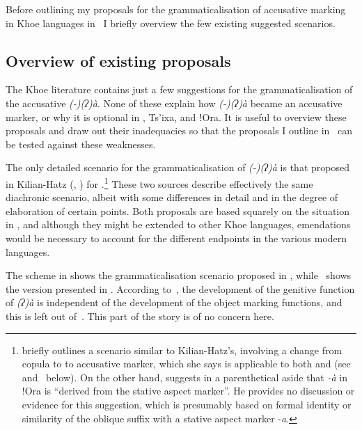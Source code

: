 \documentclass[output=paper]{LSP/langsci}
\begin{document}
Before outlining my proposals for the grammaticalisation of accusative marking in Khoe languages in~ I briefly overview the few existing suggested scenarios.

\subsection{Overview of existing proposals} \label{09-mc-sec:4-1}
The Khoe literature contains just a few suggestions for the grammaticalisation of the accusative \textit{(-)(ʔ)à}. None of these explain how \textit{(-)(ʔ)à} became an accusative marker, or why it is optional in , Ts’ixa,  and ǃOra. It is useful to overview these proposals and draw out their inadequacies so that the proposals I outline in~ can be tested against these weaknesses.

The only detailed scenario for the grammaticalisation of \textit{(-)(ʔ)à} is that proposed in Kilian-Hatz (\citeyear[55]{Kilian-Hatz2008Grammar}, \citeyear[376--378]{Kilian-Hatz2013Kxoe}) for .\footnote{\citet[276--278]{Koenig2008Case} briefly outlines a scenario similar to Kilian-Hatz’s, involving a change from copula to  to accusative marker, which she says is applicable to both  and  (see~ and~ below).  On the other hand, \citet[342]{Haacke2013Gora} suggests in a parenthetical aside that \textit{-à} in !Ora is “derived from the stative aspect marker”. He provides no discussion or evidence for this suggestion, which is presumably based on formal identity or similarity of the oblique suffix with a stative aspect marker -\textit{a}.}  
These two sources describe effectively the same diachronic scenario, albeit with some differences in detail and in the degree of elaboration of certain points. Both proposals are based squarely on the situation in , and although they might be extended to other Khoe languages, emendations would be necessary to account for the different endpoints in the various modern languages.

The scheme in  shows the grammaticalisation scenario proposed in \citet[55]{Kilian-Hatz2008Grammar}, while~ shows the version presented in \citet[376--377]{Kilian-Hatz2013Kxoe}. According to~, the development of the genitive function of \textit{(ʔ)à} is independent of the development of the object marking functions, and this is left out of~. This part of the story is of no concern here.
\end{document}
